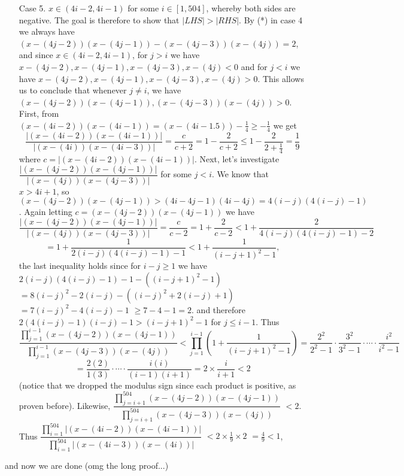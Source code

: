 \documentclass[11pt,a4paper]{article}
\begin{document}
\begin{itemize}
\begin{itemize}
\item [Case 5.]
$x\in (4i-2, 4i-1)$ for some $i\in [1, 504]$, whereby both sides are negative. 
The goal is therefore to show that $|LHS|>|RHS|$.  
By (*) in case 4 we always have 
$(x-(4j-2))(x-(4j-1))-(x-(4j-3))(x-(4j))=2$, 
and since $x\in (4i-2, 4i-1)$, for $j > i$ we have $x-(4j-2), x-(4j-1), x-(4j-3), x-(4j)<0$ and 
for $j<i$ we have $x-(4j-2), x-(4j-1), x-(4j-3), x-(4j)>0$. 
This allows us to conclude that whenever $j\neq i$, we have 
$(x-(4j-2))(x-(4j-1)), (x-(4j-3))(x-(4j))>0$. 
First, from $(x-(4i-2))(x-(4i-1))=(x-(4i-1.5))-\frac 14\ge -\frac 14$ we get 
\[\frac{|(x-(4i-2))(x-(4i-1))|}{|(x-(4i))(x-(4i-3))|}=\frac{c}{c+2}=1-\frac{2}{c+2}\le 1-\frac 2{2+\frac 14}=\frac 19\] 
where $c=|(x-(4i-2))(x-(4i-1))|.$
Next, let's investigate $\dfrac{|(x-(4j-2))(x-(4j-1))|}{|(x-(4j))(x-(4j-3))|}$ 
for some $j<i$. 
We know that $x>4i+1$, so 
$(x-(4j-2))(x-(4j-1))> (4i-4j-1)(4i-4j)=4(i-j)(4(i-j)-1)$. 
Again letting $c= (x-(4j-2))(x-(4j-1))$ we have 
\[\frac{|(x-(4j-2))(x-(4j-1))|}{|(x-(4j))(x-(4j-3))|}
=\frac{c}{c-2}
=1+\frac 2{c-2}
<1+\frac 2{4(i-j)(4(i-j)-1)-2}\]
\[=1+\frac 1{2(i-j)(4(i-j)-1)-1}
<1+\frac 1{(i-j+1)^2-1},\]
the last inequality holds since for $i-j\ge 1$ we have 
$2(i-j)(4(i-j)-1)-1-((i-j+1)^2-1)$
$=8(i-j)^2-2(i-j)-((i-j)^2+2(i-j)+1)$
$=7(i-j)^2-4(i-j)-1$
$\ge 7-4-1=2$. 
and therefore $2(4(i-j)-1)(i-j)-1>(i-j+1)^2-1$ for $j\le i-1$.
Thus 
\[\dfrac{\displaystyle\prod_{j=1}^{i-1} (x-(4j-2))(x-(4j-1))}{\displaystyle\prod_{j=1}^{i-1} (x-(4j-3))(x-(4j))}
<\displaystyle\prod_{j=1}^{i-1}\left(1+\frac 1{(i-j+1)^2-1}\right)
=\frac{2^2}{2^2-1}\cdot\frac{3^2}{3^2-1}\cdot\cdots\cdot \frac{i^2}{i^2-1}\]
\[=\frac{2(2)}{1(3)}\cdot\cdots\cdot \frac{i(i)}{(i-1)(i+1)}
=2\times\frac{i}{i+1}<2\]
(notice that we dropped the modulus sign since each product is positive, as proven before).  
Likewise, $\dfrac{\displaystyle\prod_{j=i+1}^{504} (x-(4j-2))(x-(4j-1))}{\displaystyle\prod_{j=i+1}^{504} (x-(4j-3))(x-(4j))}$
$<2$. 
Thus $\dfrac{\displaystyle\prod_{i=1}^{504} |(x-(4i-2))(x-(4i-1))|}{\displaystyle\prod_{i=1}^{504} |(x-(4i-3))(x-(4i))|}$
$<2\times \frac{1}{9}\times 2$
$=\frac 49<1$, 

\end{itemize}
and now we are done (omg the long proof...)

\end{itemize}

\newpage
\end{document}
